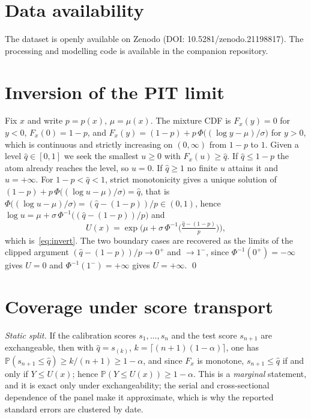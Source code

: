 \documentclass[preprint,3p,times]{elsarticle}
\begin{document}
\section*{Data availability}
The dataset is openly available on Zenodo (DOI: 10.5281/zenodo.21198817). The processing and modelling code is available in the companion repository.

\appendix

\section{Inversion of the PIT limit}
\label{app:inversion}

Fix $x$ and write $p=p(x)$, $\mu=\mu(x)$. The mixture CDF is $F_x(y)=0$ for $y<0$, $F_x(0)=1-p$, and $F_x(y)=(1-p)+p\,\Phi\big((\log y-\mu)/\sigma\big)$ for $y>0$, which is continuous and strictly increasing on $(0,\infty)$ from $1-p$ to $1$. Given a level $\hat q\in[0,1]$ we seek the smallest $u\ge 0$ with $F_x(u)\ge \hat q$. If $\hat q\le 1-p$ the atom already reaches the level, so $u=0$. If $\hat q\ge 1$ no finite $u$ attains it and $u=+\infty$. For $1-p<\hat q<1$, strict monotonicity gives a unique solution of $(1-p)+p\,\Phi\big((\log u-\mu)/\sigma\big)=\hat q$, that is $\Phi\big((\log u-\mu)/\sigma\big)=(\hat q-(1-p))/p\in(0,1)$, hence $\log u=\mu+\sigma\,\Phi^{-1}\big((\hat q-(1-p))/p\big)$ and
\[
U(x)=\exp\!\Big(\mu+\sigma\,\Phi^{-1}\big(\tfrac{\hat q-(1-p)}{p}\big)\Big),
\]
which is~\eqref{eq:invert}. The two boundary cases are recovered as the limits of the clipped argument $(\hat q-(1-p))/p\to 0^+$ and $\to 1^-$, since $\Phi^{-1}(0^+)=-\infty$ gives $U=0$ and $\Phi^{-1}(1^-)=+\infty$ gives $U=+\infty$. \qed

\section{Coverage under score transport}
\label{app:coverage}

\emph{Static split.} If the calibration scores $s_1,\dots,s_n$ and the test score $s_{n+1}$ are exchangeable, then with $\hat q=s_{(k)}$, $k=\lceil(n+1)(1-\alpha)\rceil$, one has $\mathbb{P}(s_{n+1}\le\hat q)\ge k/(n+1)\ge 1-\alpha$, and since $F_x$ is monotone, $s_{n+1}\le\hat q$ if and only if $Y\le U(x)$; hence $\mathbb{P}(Y\le U(x))\ge 1-\alpha$. This is a \emph{marginal} statement, and it is exact only under exchangeability; the serial and cross-sectional dependence of the panel make it approximate, which is why the reported standard errors are clustered by date.
\end{document}
